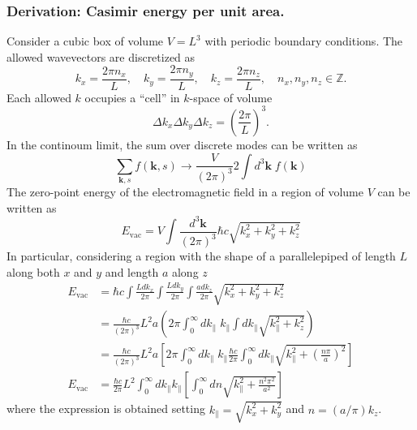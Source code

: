 \documentclass[../../../main.tex]{subfiles}
\begin{document}
\subsubsection{Derivation: Casimir energy per unit area.}
Consider a cubic box of volume \( V = L^3 \) with periodic boundary conditions. The allowed wavevectors are discretized as
\[
  k_x = \frac{2\pi n_x}{L}, \quad k_y = \frac{2\pi n_y}{L}, \quad k_z = \frac{2\pi n_z}{L}, \quad n_x, n_y, n_z \in \mathbb{Z}.
\]
Each allowed \( k \) occupies a ``cell'' in \( k \)-space of volume
\[
  \Delta k_x \Delta k_y \Delta k_z = \left( \frac{2\pi}{L} \right)^3.
\]
In the continoum limit, the sum over discrete modes can be written as
\begin{equation*}
  \sum_{\mathbf{k},s} f(\mathbf{k},s) \rightarrow  \frac{V}{(2\pi)^{3}} 2\int d^{3}\mathbf{k} \; f(\mathbf{k})
\end{equation*}
The zero-point energy of the electromagnetic ﬁeld in a region of volume $V$ can be written as
\begin{equation*}
  E_\text{vac}=
  V \int \frac{d^{3}\mathbf{k}}{(2\pi)^{3}} \hbar c \sqrt{k_{x}^{2} + k_{y}^{2} + k_{z}^{2}}
\end{equation*}
In particular, considering a region with the shape of a parallelepiped of length $L$ along both $x$ and $y$ and length $a$ along $z$
\begin{align*}
  E_\text{vac} & = \hbar c \int  \frac{L dk_{x}}{2\pi} \int \frac{L dk_{y}}{2\pi} \int  \frac{a dk_{z}}{2\pi} \sqrt{k_{x}^{2} + k_{y}^{2} + k_{z}^{2}}                                                                           \\
               & = \frac{\hbar  c }{(2\pi)^3 }L^2 a \left( 2\pi \int_{0 }^{\infty }dk_{\parallel}\;k_{\parallel}\int dk_{\parallel}\sqrt{k_{\parallel}^2+k_z^2} \right)                                                          \\
               & = \frac{\hbar  c }{(2\pi)^3 }L^2 a \left[ 2\pi \int_{0 }^{\infty }dk_{\parallel}\;k_{\parallel}\frac{\hbar c}{2\pi}\int_0^\infty dk_{\parallel}\sqrt{k_{\parallel}^2+\left( \frac{n \pi}{a} \right) ^2} \right] \\
  E_\text{vac}
               & =  \frac{\hbar c}{2\pi} L^{2} \int_{0}^{\infty} dk_{\parallel}k_{\parallel}\left[\int_{0}^{\infty} dn \sqrt{k_{\parallel}^{2} + \frac{n^{2} \pi^{2}}{a^{2}}}\right]
\end{align*}
where the expression is obtained setting $k_{\parallel} = \sqrt{k_{x}^{2} + k_{y}^{2}}$ and $n = (a/\pi)k_{z}$.
\end{document}

